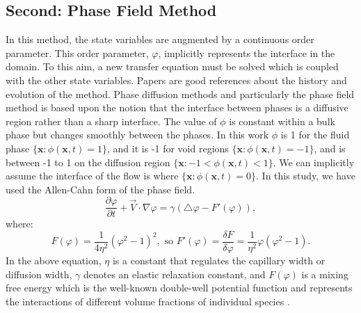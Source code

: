 \documentclass[review]{elsarticle}
\begin{document}
\subsection{Second: Phase Field Method} \label{phase field}
In this method, the state variables are augmented by a continuous
order parameter. This order parameter, $\varphi$, 
implicitly represents the interface in the domain. To this aim, a new transfer equation must be solved which is coupled with the other state variables. 
Papers \cite{Anderson1998,Chen2002,Boettinger2002,Kim2012} are good references about the history and evolution of the method.
Phase diffusion methods and particularly the phase field method is based upon the notion that the interface between phases is a diffusive region rather than a sharp interface. 
The value of $\phi$ is constant within a bulk phase but changes smoothly between the phases. In this work $\phi$ is 1 for the fluid phase $ \lbrace \textbf{x}: \phi(\textbf{x},t)=1 \rbrace  $, 
and it is -1 for void regions $ \lbrace \textbf{x}: \phi(\textbf{x},t)=-1 \rbrace  $, and is between -1 to 1 on the diffusion region $ \lbrace \textbf{x}: -1 < \phi(\textbf{x},t) < 1 \rbrace  $. 
We can implicitly assume the interface of the flow is where $ \lbrace \textbf{x}: \phi(\textbf{x},t)= 0 \rbrace  $.
In this study, we have used the Allen-Cahn form of the phase field. 
\begin{equation} 
        \label{allencahn}
        \frac{\partial \varphi }{\partial t} + \overrightarrow{V}\cdot \nabla \varphi = 
        \gamma (\bigtriangleup\varphi -F'(\varphi)),
\end{equation}
where:
\begin{equation} 
        \label{fprime}
        F(\varphi)=\frac{1}{4\eta^2} (\varphi^2-1)^2 ,\text{\ so \ \ } F'(\varphi)= \frac{\delta F}{\delta \varphi} = \frac{1}{\eta^2} \varphi (\varphi^2 -1).
\end{equation}
In the above equation, $\eta$ is a constant that regulates the capillary width or diffusion width, $ \gamma $ denotes an elastic relaxation constant, and $F(\varphi)$ is 
a mixing free energy which is the well-known double-well potential function and represents the interactions of different volume fractions of individual species \cite{Bronsard1990,Larson1999}.
\end{document}
